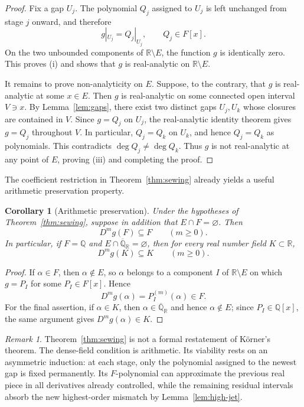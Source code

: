 \documentclass[11pt,reqno]{amsart}
\numberwithin{equation}{section}
\newtheorem{corollary}[theorem]{Corollary}
\theoremstyle{definition}
\theoremstyle{remark}
\newtheorem{remark}[theorem]{Remark}
\newcommand{\R}{\mathbb R}
\newcommand{\Q}{\mathbb Q}
\newcommand{\Ralg}{\overline{\mathbb Q}_{\mathbb R}}
\begin{document}
\begin{proof}
Fix a gap $U_j$. The polynomial $Q_j$ assigned to $U_j$ is left unchanged from stage $j$ onward,
and therefore
\[
g|_{U_j}=Q_j|_{U_j},
\qquad
Q_j\in F[x].
\]
On the two unbounded components of $\R\setminus E$, the function $g$ is
identically zero. This proves \textup{(i)} and shows that $g$ is
real-analytic on $\R\setminus E$.

It remains to prove non-analyticity on $E$. Suppose, to the contrary,
that $g$ is real-analytic at some $x\in E$. Then $g$ is real-analytic on
some connected open interval $V\ni x$. By Lemma~\ref{lem:gaps}, there
exist two distinct gaps $U_j,U_k$ whose closures are contained in $V$.
Since $g=Q_j$ on $U_j$, the real-analytic identity theorem gives
$g=Q_j$ throughout $V$. In particular, $Q_j=Q_k$ on $U_k$, and hence
$Q_j=Q_k$ as polynomials. This contradicts
$\deg Q_j\neq\deg Q_k$. Thus $g$ is not real-analytic at any point of
$E$, proving \textup{(iii)} and completing the proof.
\end{proof}

The coefficient restriction in Theorem~\ref{thm:sewing} already yields a useful arithmetic preservation property.

\begin{corollary}[Arithmetic preservation]\label{cor:sewing-arithmetic}
Under the hypotheses of Theorem~\ref{thm:sewing}, suppose in addition that
$E\cap F=\varnothing$. Then
\[
D^m g(F)\subseteq F
\qquad (m\geq0).
\]
In particular, if $F=\Q$ and $E\cap\Ralg=\varnothing$, then for every real
number field $K\subset\R$,
\[
D^m g(K)\subseteq K
\qquad (m\geq0).
\]
\end{corollary}
\begin{proof}
If $\alpha\in F$, then $\alpha\notin E$, so $\alpha$ belongs to a component
$I$ of $\R\setminus E$ on which $g=P_I$ for some $P_I\in F[x]$. Hence
\[
D^m g(\alpha)=P_I^{(m)}(\alpha)\in F.
\]
For the final assertion, if $\alpha\in K$, then $\alpha\in\Ralg$ and hence
$\alpha\notin E$; since $P_I\in\Q[x]$, the same argument gives
$D^m g(\alpha)\in K$.
\end{proof}


\begin{remark}\label{rem:korner}
Theorem~\ref{thm:sewing} is not a formal restatement of Körner's theorem.  The dense-field condition is arithmetic.  Its viability rests on an asymmetric induction: at each stage, only the polynomial assigned to the newest gap is fixed permanently.  Its $F$-polynomial can approximate the previous real piece in all derivatives already controlled, while the remaining residual intervals absorb the new highest-order mismatch by Lemma~\ref{lem:high-jet}.
\end{remark}
\end{document}
